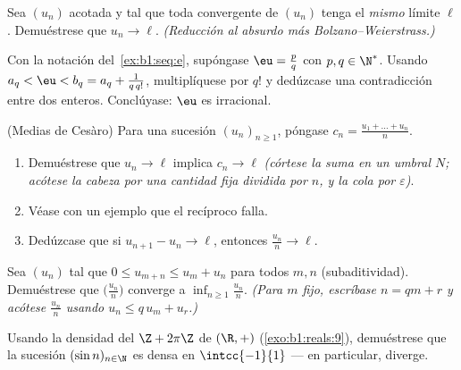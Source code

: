 \begin{exercise}[$\star\star$]\label{exo:b1:seq:8}
Sea $(u_n)$ acotada y tal que toda  convergente de $(u_n)$
tenga el \emph{mismo} límite $\ell$. Demuéstrese que $u_n \to \ell$.
\emph{(Reducción al absurdo más Bolzano--Weierstrass.)}
\end{exercise}

\begin{exercise}[$\star\star\star$]\label{exo:b1:seq:9}
Con la notación del~\cref{ex:b1:seq:e}, supóngase $\eu = \frac pq$ con
$p, q \in \N^*$. Usando $a_q < \eu < b_q = a_q + \frac{1}{q\, q!}$,
multiplíquese por $q!$ y dedúzcase una contradicción entre dos
enteros. Conclúyase: $\eu$ es irracional.
\end{exercise}

\begin{exercise}[$\star\star\star$]\label{exo:b1:seq:10}
(Medias de Cesàro) Para una sucesión $(u_n)_{n \geq 1}$, póngase
$c_n = \frac{u_1 + \dots + u_n}{n}$.
\begin{enumerate}
  \item Demuéstrese que $u_n \to \ell$ implica $c_n \to \ell$
        \emph{(córtese la suma en un umbral $N$; acótese la cabeza por
        una cantidad fija dividida por $n$, y la cola por
        $\varepsilon$)}.
  \item Véase con un ejemplo que el recíproco falla.
  \item Dedúzcase que si $u_{n+1} - u_n \to \ell$, entonces
        $\frac{u_n}{n} \to \ell$.
\end{enumerate}
\end{exercise}

\begin{exercise}[$\star\star\star$]\label{exo:b1:seq:11}
Sea $(u_n)$ tal que $0 \leq u_{m+n} \leq u_m + u_n$ para todos $m, n$
(subaditividad). Demuéstrese que $\bigl(\frac{u_n}{n}\bigr)$ converge
a $\inf_{n \geq 1} \frac{u_n}{n}$. \emph{(Para $m$ fijo, escríbase
$n = qm + r$ y acótese $\frac{u_n}{n}$ usando $u_n \leq q\,u_m + u_r$.)}
\end{exercise}

\begin{exercise}[$\star\star\star$]\label{exo:b1:seq:12}
Usando la densidad del  $\Z + 2\pi\Z$ de $(\R, +)$
(\cref{exo:b1:reals:9}), demuéstrese que la sucesión
$(\sin n)_{n \in \N}$ es densa en $\intcc{-1}{1}$ --- en particular,
diverge.
\end{exercise}

